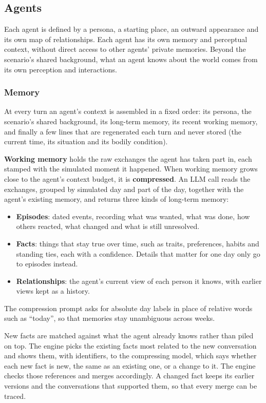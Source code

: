 \subsection{Agents}
\label{sec:methods:agents}

Each agent is defined by a persona, a starting place, an outward appearance and its own map of relationships. Each agent has its own memory and perceptual context, without direct access to other agents' private memories. Beyond the scenario's shared background, what an agent knows about the world comes from its own perception and interactions.

\subsubsection{Memory}
\label{sec:methods:memory}

At every turn an agent's context is assembled in a fixed order: its persona, the scenario's shared background, its long-term memory, its recent working memory, and finally a few lines that are regenerated each turn and never stored (the current time, its situation and its bodily condition).

\textbf{Working memory} holds the raw exchanges the agent has taken part in, each stamped with the simulated moment it happened. When working memory grows close to the agent's context budget, it is \textbf{compressed}. An LLM call reads the exchanges, grouped by simulated day and part of the day, together with the agent's existing memory, and returns three kinds of long-term memory:
\begin{itemize}
  \item \textbf{Episodes}: dated events, recording what was wanted, what was done, how others reacted, what changed and what is still unresolved.
  \item \textbf{Facts}: things that stay true over time, such as traits, preferences, habits and standing ties, each with a confidence. Details that matter for one day only go to episodes instead.
  \item \textbf{Relationships}: the agent's current view of each person it knows, with earlier views kept as a history.
\end{itemize}

The compression prompt asks for absolute day labels in place of relative words such as ``today'', so that memories stay unambiguous across weeks.

New facts are matched against what the agent already knows rather than piled on top. The engine picks the existing facts most related to the new conversation and shows them, with identifiers, to the compressing model, which says whether each new fact is new, the same as an existing one, or a change to it. The engine checks those references and merges accordingly. A changed fact keeps its earlier versions and the conversations that supported them, so that every merge can be traced.

